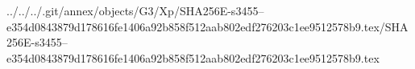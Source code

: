 ../../../.git/annex/objects/G3/Xp/SHA256E-s3455--e354d0843879d178616fe1406a92b858f512aab802edf276203c1ee9512578b9.tex/SHA256E-s3455--e354d0843879d178616fe1406a92b858f512aab802edf276203c1ee9512578b9.tex
